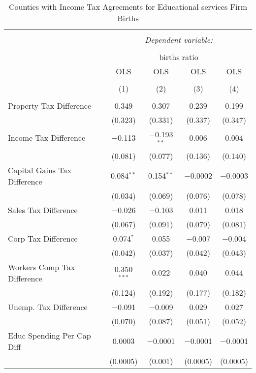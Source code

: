 
\begin{table}[!htbp] \centering 
  \caption{Counties with Income Tax Agreements for  Educational services Firm Births} 
  \label{61rd} 
\begin{tabular}{@{\extracolsep{5pt}}lcccc} 
\\[-1.8ex]\hline 
\hline \\[-1.8ex] 
 & \multicolumn{4}{c}{\textit{Dependent variable:}} \\ 
\cline{2-5} 
\\[-1.8ex] & \multicolumn{4}{c}{births ratio} \\ 
 & OLS & OLS & OLS & OLS \\ 
\\[-1.8ex] & (1) & (2) & (3) & (4)\\ 
\hline \\[-1.8ex] 
 Property Tax Difference & 0.349 & 0.307 & 0.239 & 0.199 \\ 
  & (0.323) & (0.331) & (0.337) & (0.347) \\ 
  Income Tax Difference & $-$0.113 & $-$0.193$^{**}$ & 0.006 & 0.004 \\ 
  & (0.081) & (0.077) & (0.136) & (0.140) \\ 
  Capital Gains Tax Difference & 0.084$^{**}$ & 0.154$^{**}$ & $-$0.0002 & $-$0.0003 \\ 
  & (0.034) & (0.069) & (0.076) & (0.078) \\ 
  Sales Tax Difference & $-$0.026 & $-$0.103 & 0.011 & 0.018 \\ 
  & (0.067) & (0.091) & (0.079) & (0.081) \\ 
  Corp Tax Difference & 0.074$^{*}$ & 0.055 & $-$0.007 & $-$0.004 \\ 
  & (0.042) & (0.037) & (0.042) & (0.043) \\ 
  Workers Comp Tax Difference & 0.350$^{***}$ & 0.022 & 0.040 & 0.044 \\ 
  & (0.124) & (0.192) & (0.177) & (0.182) \\ 
  Unemp. Tax Difference & $-$0.091 & $-$0.009 & 0.029 & 0.027 \\ 
  & (0.070) & (0.087) & (0.051) & (0.052) \\ 
  Educ Spending Per Cap Diff & 0.0003 & $-$0.0001 & $-$0.0001 & $-$0.0001 \\ 
  & (0.0005) & (0.001) & (0.0005) & (0.0005) \\ 

\end{tabular}
\end{table}
